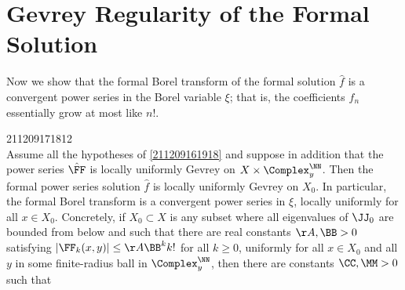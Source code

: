 \documentclass[11pt]{article}
\begin{document}
\section{Gevrey Regularity of the Formal Solution}
\label{211218192134}

Now we show that the formal Borel transform of the formal solution $\hat{f}$ is a convergent power series in the Borel variable $\xi$; that is, the coefficients $f_n$ essentially grow at most like $n!$.

\begin{prop}{211209171812}
\mbox{}\\
Assume all the hypotheses of \autoref{211209161918} and suppose in addition that the power series $\hat{\FF}$ is locally uniformly Gevrey on $X \times \Complex_y^\NN$.
Then the formal power series solution $\hat{f}$ is locally uniformly Gevrey on $X_0$.
In particular, the formal Borel transform 
is a convergent power series in $\xi$, locally uniformly for all $x \in X_0$.
Concretely, if $X_0 \subset X$ is any subset where all eigenvalues of $\JJ_0$ are bounded from below and such that there are real constants $\AA, \BB > 0$ satisfying $|\FF_k (x, y)| \leq \AA \BB^k k!$ for all $k \geq 0$, uniformly for all $x \in X_0$ and all $y$ in some finite-radius ball in $\Complex_y^\NN$, then there are constants $\CC, \MM > 0$ such that
\end{prop}
\end{document}
